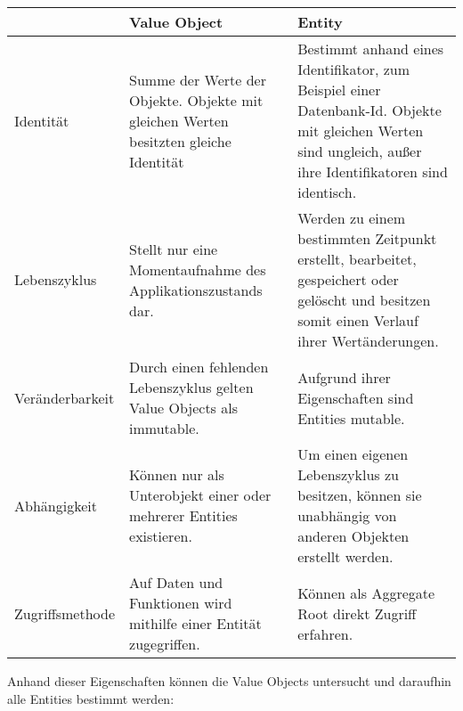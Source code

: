 \begin{tabular}{ | p{} | p{} | p{} | } 
	\hline
	& {\textbf{\centering Value Object} } & \textbf{\centering Entity} \\ 
	\hline
	Identität & 
	Summe der Werte der Objekte. Objekte mit gleichen Werten besitzten gleiche Identität & 
	Bestimmt anhand eines Identifikator, zum Beispiel einer Datenbank-Id. Objekte mit gleichen Werten sind ungleich, außer ihre Identifikatoren sind identisch. \\ 
	\hline
	Lebenszyklus & 
	Stellt nur eine Momentaufnahme des Applikationszustands dar. &
	Werden zu einem bestimmten Zeitpunkt erstellt, bearbeitet, gespeichert oder gelöscht und besitzen somit einen Verlauf ihrer Wertänderungen.  \\ 
	\hline
	Veränderbarkeit & 
	Durch einen fehlenden Lebenszyklus gelten Value Objects als immutable. &
	Aufgrund ihrer Eigenschaften sind Entities mutable.  \\ 
	\hline
	Abhängigkeit & 
	Können nur als Unterobjekt einer oder mehrerer Entities existieren. &
	Um einen eigenen Lebenszyklus zu besitzen, können sie unabhängig von anderen Objekten erstellt werden.  \\ 
	\hline
	Zugriffsmethode & 
	Auf Daten und Funktionen wird mithilfe einer Entität zugegriffen. &
	Können als Aggregate Root direkt Zugriff erfahren. \\ 
	\hline
\end{tabular}

Anhand dieser Eigenschaften können die Value Objects untersucht und daraufhin alle Entities bestimmt werden:

